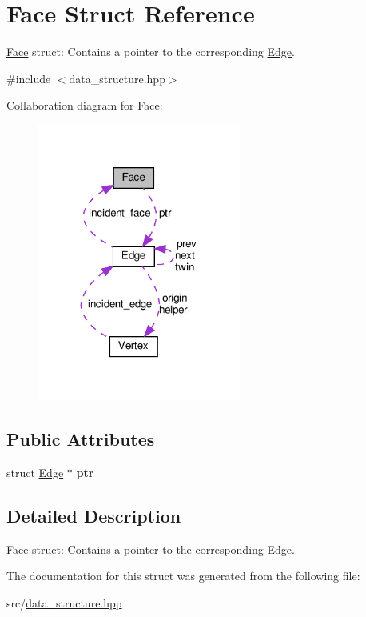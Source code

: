 \hypertarget{structFace}{}\section{Face Struct Reference}
\label{structFace}


\hyperlink{structFace}{Face} struct\+: Contains a pointer to the corresponding \hyperlink{structEdge}{Edge}.  




{\ttfamily \#include $<$data\+\_\+structure.\+hpp$>$}



Collaboration diagram for Face\+:
\nopagebreak
\begin{figure}[H]
\begin{center}
\leavevmode
\includegraphics[width=189pt]{structFace__coll__graph}
\end{center}
\end{figure}
\subsection*{Public Attributes}
\begin{DoxyCompactItemize}
\item 
\mbox{\label{structFace_a21890b9e9ec72f7f79abf7ef5592d5fd}} 
struct \hyperlink{structEdge}{Edge} $\ast$ {\bfseries ptr}
\end{DoxyCompactItemize}


\subsection{Detailed Description}
\hyperlink{structFace}{Face} struct\+: Contains a pointer to the corresponding \hyperlink{structEdge}{Edge}. 

The documentation for this struct was generated from the following file\+:\begin{DoxyCompactItemize}
\item 
src/\hyperlink{data__structure_8hpp}{data\+\_\+structure.\+hpp}\end{DoxyCompactItemize}
